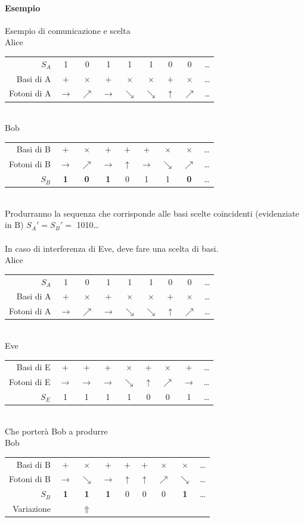\documentclass[10pt]{book}
\begin{document}
\paragraph{Esempio} Esempio di comunicazione e scelta\\
Alice
\begin{tabular}{r c c c c c c c c}
	$S_A$&1&0&1&1&1&0&0&\ldots\\
	Basi di A&$+$&$\times$&$+$&$\times$&$\times$&$+$&$\times$&\ldots\\
	Fotoni di A&$\rightarrow$&$\nearrow$&$\rightarrow$&$\searrow$&$\searrow$&$\uparrow$&$\nearrow$&\ldots
\end{tabular}\\
Bob
\begin{tabular}{r c c c c c c c c}
	Basi di B&$+$&$\times$&$+$&$+$&$+$&$\times$&$\times$&\ldots\\
	Fotoni di B&$\rightarrow$&$\nearrow$&$\rightarrow$&$\uparrow$&$\rightarrow$&$\searrow$&$\nearrow$&\ldots\\
	$S_B$&\textbf{1}&\textbf{0}&\textbf{1}&0&1&1&\textbf{0}&\ldots
\end{tabular}\\
Produrranno la sequenza che corrisponde alle basi scelte coincidenti (evidenziate in B) $S_A'=S_B' =$ 1010\ldots\\\\
In caso di interferenza di Eve, deve fare una scelta di basi.\\
Alice
\begin{tabular}{r c c c c c c c c}
	$S_A$&1&0&1&1&1&0&0&\ldots\\
	Basi di A&$+$&$\times$&$+$&$\times$&$\times$&$+$&$\times$&\ldots\\
	Fotoni di A&$\rightarrow$&$\nearrow$&$\rightarrow$&$\searrow$&$\searrow$&$\uparrow$&$\nearrow$&\ldots
\end{tabular}\\
Eve
\begin{tabular}{r c c c c c c c c}
	Basi di E&$+$&$+$&$+$&$\times$&$+$&$\times$&$+$&\ldots\\
	Fotoni di E&$\rightarrow$&$\rightarrow$&$\rightarrow$&$\searrow$&$\uparrow$&$\nearrow$&$\rightarrow$&\ldots\\
	$S_E$&1&1&1&1&0&0&1&\ldots
\end{tabular}\\Che porterà Bob a produrre\\
Bob
\begin{tabular}{r c c c c c c c c}
	Basi di B&$+$&$\times$&$+$&$+$&$+$&$\times$&$\times$&\ldots\\
	Fotoni di B&$\rightarrow$&$\searrow$&$\rightarrow$&$\uparrow$&$\uparrow$&$\nearrow$&$\searrow$&\ldots\\
	$S_B$&\textbf{1}&\textbf{1}&\textbf{1}&0&0&0&\textbf{1}&\ldots\\
	Variazione & & $\Uparrow$
\end{tabular}
\end{document}
